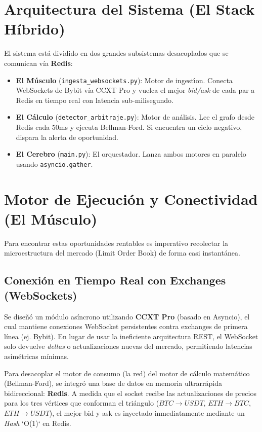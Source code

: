 \documentclass[11pt,a4paper]{article}
\begin{document}
\section{Arquitectura del Sistema (El Stack H\'ibrido)}

El sistema est\'a dividido en dos grandes subsistemas desacoplados que se comunican v\'ia \textbf{Redis}:

\begin{itemize}
    \item \textbf{El M\'usculo} (\texttt{ingesta\_websockets.py}): Motor de ingest\'{\i}on. Conecta WebSockets de Bybit v\'ia CCXT Pro y vuelca el mejor \textit{bid/ask} de cada par a Redis en tiempo real con latencia sub-milisegundo.
    \item \textbf{El C\'alculo} (\texttt{detector\_arbitraje.py}): Motor de an\'alisis. Lee el grafo desde Redis cada 50ms y ejecuta Bellman-Ford. Si encuentra un ciclo negativo, dispara la alerta de oportunidad.
    \item \textbf{El Cerebro} (\texttt{main.py}): El orquestador. Lanza ambos motores en paralelo usando \texttt{asyncio.gather}.
\end{itemize}

\section{Motor de Ejecuci\'on y Conectividad (El M\'usculo)}

Para encontrar estas oportunidades rentables es imperativo recolectar la microestructura del mercado (Limit Order Book) de forma casi instantánea. 

\subsection{Conexión en Tiempo Real con Exchanges (WebSockets)}

Se diseñó un módulo asíncrono utilizando \textbf{CCXT Pro} (basado en Asyncio), el cual mantiene conexiones WebSocket persistentes contra exchanges de primera línea (ej. Bybit). En lugar de usar la ineficiente arquitectura REST, el WebSocket solo devuelve \textit{deltas} o actualizaciones nuevas del mercado, permitiendo latencias asimétricas mínimas.

Para desacoplar el motor de consumo (la red) del motor de cálculo matemático (Bellman-Ford), se integró una base de datos en memoria ultrarrápida bidireccional: \textbf{Redis}.
A medida que el socket recibe las actualizaciones de precios para los tres vértices que conforman el triángulo ($BTC\to USDT$, $ETH\to BTC$, $ETH\to USDT$), el mejor bid y ask es inyectado inmediatamente mediante un \textit{Hash} `O(1)` en Redis.
\end{document}
